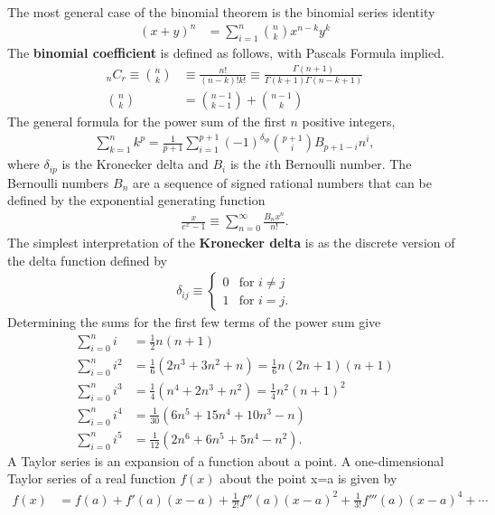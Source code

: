 The most general case of the binomial theorem is the binomial series identity 
\begin{align}
(x+y)^n &= \sum_{i=1}^{n} {{n}\choose{k}}x^{n-k}y^{k}
\end{align}
The \textbf{binomial coefficient} is defined as follows, with Pascals Formula implied.
\begin{align}
_nC_r\equiv{{n}\choose{k}} &\equiv \frac{n!}{(n-k)!k!} \equiv \frac{\Gamma(n+1)}{\Gamma(k+1)\Gamma(n-k+1)} \\
{{n}\choose{k}}&={{n-1}\choose{k-1}}+{{n-1}\choose{k}}
\end{align}
The general formula for the power sum of the first $n$ positive integers, 
\begin{align}
\sum_{k=1}^{n}k^p=\frac{1}{p+1}\sum_{i=1}^{p+1}(-1)^{\delta_{ip}}{{p+1}\choose{i}}B_{p+1-i}n^i,
\end{align}
where $\delta_{ip}$ is the Kronecker delta and $B_i$ is the $i$th Bernoulli number. The Bernoulli numbers $B_n$ are a sequence of signed rational numbers that can be defined by the exponential generating function 
\begin{align}
\frac{x}{e^x-1}\equiv\sum_{n=0}^{\infty}\frac{B_nx^n}{n!}.
\end{align}
The simplest interpretation of the \textbf{Kronecker delta} is as the discrete version of the delta function defined by 
\begin{align}
\delta_{ij}\equiv
\begin{cases}
0 & \textrm{for } i \neq j \\
1 & \textrm{for } i = j.
\end{cases}
\end{align}
Determining the sums for the first few terms of the power sum give
\begin{align}
\sum_{i=0}^{n}i   &=\frac{1}{2}n(n+1) \\
\sum_{i=0}^{n}i^2 &=\frac{1}{6}(2n^3+3n^2+n)=\frac{1}{6}n(2n+1)(n+1) \\
\sum_{i=0}^{n}i^3 &=\frac{1}{4}(n^4+2n^3+n^2)=\frac{1}{4}n^2(n+1)^2 \\
\sum_{i=0}^{n}i^4 &=\frac{1}{30}(6n^5+15n^4+10n^3-n) \\
\sum_{i=0}^{n}i^5 &=\frac{1}{12}(2n^6+6n^5+5n^4-n^2).
\end{align}
A Taylor series is an expansion of a function about a point. A one-dimensional Taylor series of a real function $f(x)$ about the point x=a is given by 
\begin{align}
f(x)&=f(a)+f'(a)(x-a)+\frac{1}{2!}f''(a)(x-a)^2+\frac{1}{3!}f'''(a)(x-a)^4+\cdots 
\end{align}

